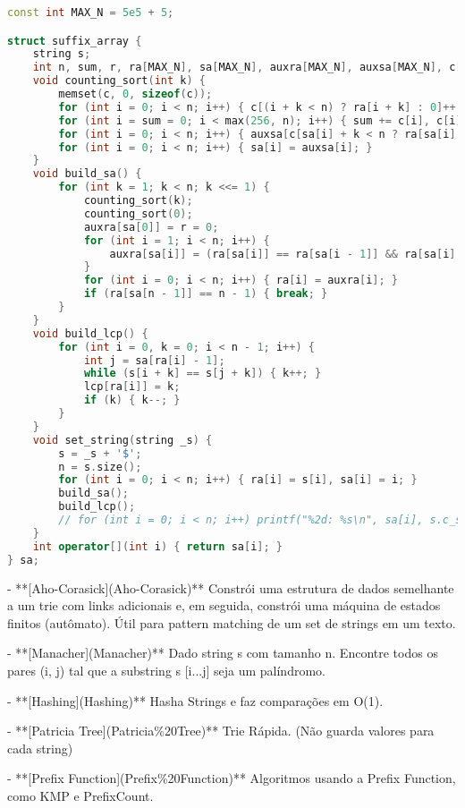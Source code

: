 \documentclass[11pt, a4paper, twoside]{article}
\begin{document}
\begin{lstlisting}[language=C++]
const int MAX_N = 5e5 + 5;

struct suffix_array {
    string s;
    int n, sum, r, ra[MAX_N], sa[MAX_N], auxra[MAX_N], auxsa[MAX_N], c[MAX_N], lcp[MAX_N];
    void counting_sort(int k) {
        memset(c, 0, sizeof(c));
        for (int i = 0; i < n; i++) { c[(i + k < n) ? ra[i + k] : 0]++; }
        for (int i = sum = 0; i < max(256, n); i++) { sum += c[i], c[i] = sum - c[i]; }
        for (int i = 0; i < n; i++) { auxsa[c[sa[i] + k < n ? ra[sa[i] + k] : 0]++] = sa[i]; }
        for (int i = 0; i < n; i++) { sa[i] = auxsa[i]; }
    }
    void build_sa() {
        for (int k = 1; k < n; k <<= 1) {
            counting_sort(k);
            counting_sort(0);
            auxra[sa[0]] = r = 0;
            for (int i = 1; i < n; i++) {
                auxra[sa[i]] = (ra[sa[i]] == ra[sa[i - 1]] && ra[sa[i] + k] == ra[sa[i - 1] + k]) ? r : ++r;
            }
            for (int i = 0; i < n; i++) { ra[i] = auxra[i]; }
            if (ra[sa[n - 1]] == n - 1) { break; }
        }
    }
    void build_lcp() {
        for (int i = 0, k = 0; i < n - 1; i++) {
            int j = sa[ra[i] - 1];
            while (s[i + k] == s[j + k]) { k++; }
            lcp[ra[i]] = k;
            if (k) { k--; }
        }
    }
    void set_string(string _s) {
        s = _s + '$';
        n = s.size();
        for (int i = 0; i < n; i++) { ra[i] = s[i], sa[i] = i; }
        build_sa();
        build_lcp();
        // for (int i = 0; i < n; i++) printf("%2d: %s\n", sa[i], s.c_str() + sa[i]);
    }
    int operator[](int i) { return sa[i]; }
} sa;
\end{lstlisting}



- **[Aho-Corasick](Aho-Corasick)**  
Constrói uma estrutura de dados semelhante a um trie com links adicionais e, em seguida, constrói uma máquina de estados finitos (autômato). Útil para pattern matching de um set de strings em um texto.

- **[Manacher](Manacher)**  
Dado string s com tamanho n. Encontre todos os pares (i, j) tal que a substring s [i...j] seja um palíndromo.

- **[Hashing](Hashing)**  
Hasha Strings e faz comparações em O(1).

- **[Patricia Tree](Patricia\%20Tree)**  
Trie Rápida. (Não guarda valores para cada string)

- **[Prefix Function](Prefix\%20Function)**  
Algoritmos usando a Prefix Function, como KMP e PrefixCount.
\end{document}
